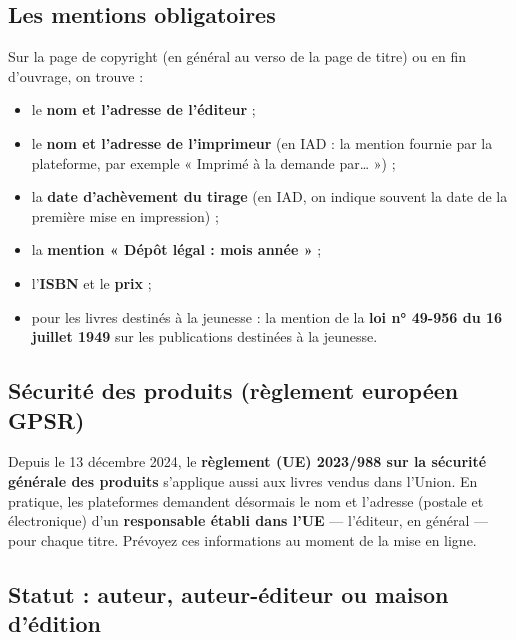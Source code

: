 
\subsection{Les mentions obligatoires}

Sur la page de copyright (en général au verso de la page de titre) ou
en fin d’ouvrage, on trouve :

\begin{itemize}
  \item le \textbf{nom et l’adresse de l’éditeur} ;
  \item le \textbf{nom et l’adresse de l’imprimeur} (en IAD : la mention
        fournie par la plateforme, par exemple « Imprimé à la demande
        par… ») ;
  \item la \textbf{date d’achèvement du tirage} (en IAD, on indique
        souvent la date de la première mise en impression) ;
  \item la \textbf{mention « Dépôt légal : mois année »} ;
  \item l’\textbf{ISBN} et le \textbf{prix} ;
  \item pour les livres destinés à la jeunesse : la mention de la
        \textbf{loi n° 49-956 du 16 juillet 1949} sur les publications
        destinées à la jeunesse.
\end{itemize}

\subsection{Sécurité des produits (règlement européen GPSR)}

Depuis le 13 décembre 2024, le \textbf{règlement (UE) 2023/988 sur la
sécurité générale des produits} s’applique aussi aux livres vendus dans
l’Union. En pratique, les plateformes demandent désormais le nom et
l’adresse (postale et électronique) d’un \textbf{responsable établi dans
l’UE} — l’éditeur, en général — pour chaque titre. Prévoyez ces
informations au moment de la mise en ligne.

\subsection{Statut : auteur, auteur-éditeur ou maison d’édition}

